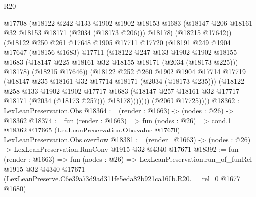 \begin{lexlean}{R20}
\begin{coremodule}
                    @17708
                    (@18122
                      @242
                      @133
                      @1902
                      @1902
                      @18153
                      @1683
                      (@18147 @206 @18161 @32 @18153 @18171 (@2034 (@18173 @206)))
                      @18178)
                    (@18215 @17642))
                  (@18122
                    @250
                    @261
                    @17648
                    @1905
                    @17711
                    @17720
                    (@18191
                      @249
                      @1904
                      @17647
                      (@18156 @1683)
                      @17711
                      (@18122
                        @247
                        @133
                        @1902
                        @1902
                        @18155
                        @1683
                        (@18147 @225 @18161 @32 @18155 @18171 (@2034 (@18173 @225)))
                        @18178)
                      (@18215 @17646))
                    (@18122
                      @252
                      @260
                      @1902
                      @1904
                      @17714
                      @17719
                      (@18147 @235 @18161 @32 @17714 @18171 (@2034 (@18173 @235)))
                      (@18122
                        @258
                        @133
                        @1902
                        @1902
                        @17717
                        @1683
                        (@18147 @257 @18161 @32 @17717 @18171 (@2034 (@18173 @257)))
                        @18178)))))))
          (@2060 @17725))))
@18362 := LexLeanPreservation.Obs
@18364 := (render : @1663) -> (nodes : @26) -> @18362
@18374 := fun (render : @1663) =>
  fun (nodes : @26) =>
  cond.{1} @18362 @17665 (LexLeanPreservation.Obs.value @17670) LexLeanPreservation.Obs.overflow
@18381 := (render : @1663) -> (nodes : @26) -> LexLeanPreservation.RunConv @1915 @32 @4340 @17671
@18392 := fun (render : @1663) =>
  fun (nodes : @26) =>
  LexLeanPreservation.run_of_funRel
    @1915
    @32
    @4340
    @17671
    (LexLeanPreserve.C6e39a73d9ad311fe5eda82b921ca160b.R20.__rel_0 @1677 @1680)
\end{coremodule}
\end{lexlean}
